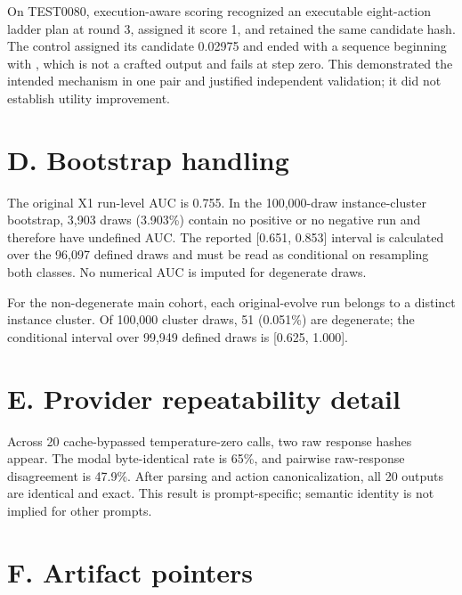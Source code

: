 \documentclass{article}
\begin{document}
On TEST0080, execution-aware scoring recognized an executable eight-action ladder plan at round 3, assigned it score 1, and retained the same candidate hash. The control assigned its candidate 0.02975 and ended with a sequence beginning with \texttt{}, which is not a crafted output and fails at step zero. This demonstrated the intended mechanism in one pair and justified independent validation; it did not establish utility improvement.

\section{D. Bootstrap handling}

The original X1 run-level AUC is 0.755. In the 100,000-draw instance-cluster bootstrap, 3,903 draws (3.903\%) contain no positive or no negative run and therefore have undefined AUC. The reported [0.651, 0.853] interval is calculated over the 96,097 defined draws and must be read as conditional on resampling both classes. No numerical AUC is imputed for degenerate draws.

For the non-degenerate main cohort, each original-evolve run belongs to a distinct instance cluster. Of 100,000 cluster draws, 51 (0.051\%) are degenerate; the conditional interval over 99,949 defined draws is [0.625, 1.000].

\section{E. Provider repeatability detail}

Across 20 cache-bypassed temperature-zero calls, two raw response hashes appear. The modal byte-identical rate is 65\%, and pairwise raw-response disagreement is 47.9\%. After parsing and action canonicalization, all 20 outputs are identical and exact. This result is prompt-specific; semantic identity is not implied for other prompts.

\section{F. Artifact pointers}
\end{document}
